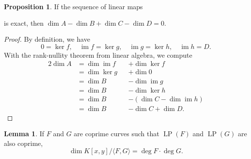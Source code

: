 \documentclass[12pt]{article}
\newenvironment{fullbox}{\begin{lrbox}{\savefullbox}\begin{minipage}{\dimexpr\textwidth-2\fboxsep\relax}}{\end{minipage}\end{lrbox}\begin{center}\framebox[\textwidth]{\usebox{\savefullbox}}\end{center}}
\theoremstyle{definition}
\newtheorem{lemma}[theorem]{Lemma}
\newtheorem{proposition}[theorem]{Proposition}
\newenvironment{blemma}{\begin{fullbox}\begin{lemma}}{\end{lemma}\end{fullbox}}
\newenvironment{bproposition}{\begin{fullbox}\begin{proposition}}{\end{proposition}\end{fullbox}}
\newcommand{\<}{\langle}
\renewcommand{\>}{\rangle}
\DeclareMathOperator{\LP}{LP}
\DeclareMathOperator{\im}{im}
\begin{document}
\begin{bproposition}\label{exact-4-sequence}
    If the sequence of linear maps
    \begin{center}
    \end{center}
    is exact, then $\dim A - \dim B + \dim C - \dim D = 0$.
\end{bproposition}

\begin{proof}
    By definition, we have
    \[
        0 = \ker f, \quad \im f = \ker g, \quad \im g = \ker h, \quad \im h = D.
    \]
    With the rank-nullity theorem from linear algebra, we compute
    \begin{alignat*}{2}
        \dim A
            &= \dim \im f   &&+ \dim \ker f \\
            &= \dim \ker g  &&+ \dim 0 \\
            &= \dim B       &&- \dim \im g \\
            &= \dim B       &&- \dim \ker h \\
            &= \dim B       &&- (\dim C - \dim \im h) \\
            &= \dim B       &&- \dim C + \dim D.
    \end{alignat*}

\end{proof}


\begin{blemma}\label{dim-prod-deg}
    If $F$ and $G$ are coprime curves such that $\LP(F)$ and $\LP(G)$ are also coprime,
    \[
        \dim K[x, y] / \<F, G\> = \deg F \cdot \deg G.
    \]
\end{blemma}
\end{document}
